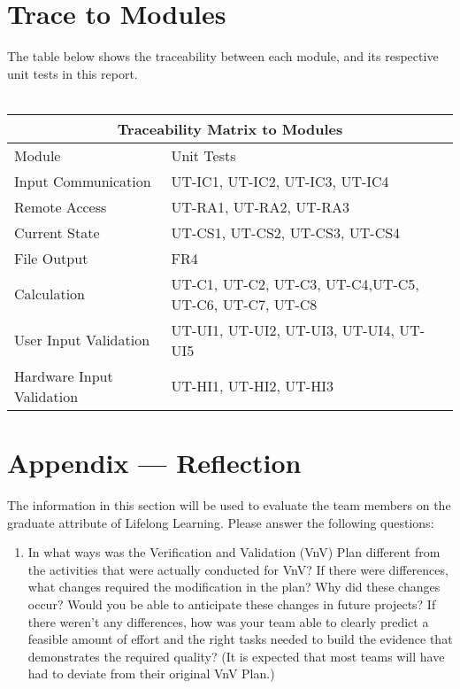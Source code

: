\documentclass[12pt, titlepage]{article}
\begin{document}
\section{Trace to Modules}		
The table below shows the traceability between each module, and its respective unit tests in this report.\\
\\
\begin{tabular}{ |p{5cm}||p{5cm}| }
  \hline
  \multicolumn{2}{|c|}{Traceability Matrix to Modules} \\
  \hline
  Module & Unit Tests \\
  \hline
  Input Communication   & UT-IC1, UT-IC2, UT-IC3, UT-IC4  \\ \hline
  Remote Access   & UT-RA1, UT-RA2, UT-RA3   \\ \hline
  Current State   & UT-CS1, UT-CS2, UT-CS3, UT-CS4   \\ \hline
  File Output   & FR4   \\ \hline
  Calculation   & UT-C1, UT-C2, UT-C3, UT-C4,UT-C5, UT-C6, UT-C7, UT-C8   \\ \hline
  User Input Validation  & UT-UI1, UT-UI2, UT-UI3, UT-UI4, UT-UI5   \\ \hline
  Hardware Input Validation  & UT-HI1, UT-HI2, UT-HI3  \\ \hline
  
 \end{tabular}


% 

\newpage{}
\section*{Appendix --- Reflection}

The information in this section will be used to evaluate the team members on the
graduate attribute of Lifelong Learning.  Please answer the following questions:

\begin{enumerate}
  \item In what ways was the Verification and Validation (VnV) Plan different
  from the activities that were actually conducted for VnV?  If there were
  differences, what changes required the modification in the plan?  Why did
  these changes occur?  Would you be able to anticipate these changes in future projects?  If there weren't any differences, how was your team able to clearly predict a feasible amount of effort and the right tasks needed to build the evidence that demonstrates the required quality?  (It is expected that most teams will have had to deviate from their original VnV Plan.)
\end{enumerate}
\end{document}
